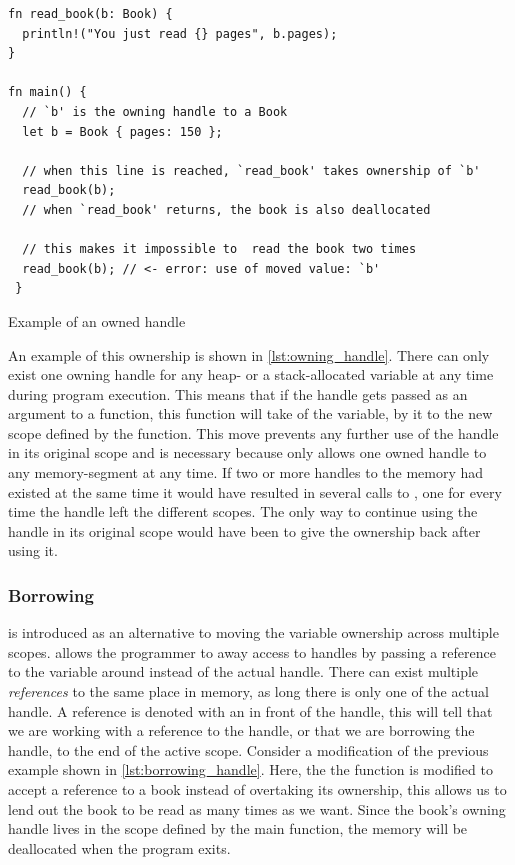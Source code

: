 \begin{listing}[tb]
\begin{verbatim}
fn read_book(b: Book) {
  println!("You just read {} pages", b.pages);
}

fn main() {
  // `b' is the owning handle to a Book
  let b = Book { pages: 150 };

  // when this line is reached, `read_book' takes ownership of `b'
  read_book(b);
  // when `read_book' returns, the book is also deallocated

  // this makes it impossible to  read the book two times
  read_book(b); // <- error: use of moved value: `b'
 }
\end{verbatim}
\caption{Example of an owned handle}
\label{lst:owning_handle}
\end{listing}

An example of this ownership is shown in \autoref{lst:owning_handle}.
There can only exist one owning handle for any heap- or a stack-allocated variable at any time during program execution.
This means that if the handle gets passed as an argument to a function, this function will take  of the variable, by  it to the new scope defined by the function.
This move prevents any further use of the handle in its original scope and is necessary because \rust only allows one owned handle to any memory-segment at any time.
If two or more handles to the memory had existed at the same time it would have resulted in several calls to , one for every time the handle left the different scopes.
The only way to continue using the handle in its original scope would have been to give the ownership back after using it.

\subsubsection{Borrowing}
\label{ssec:borrowing}

 is introduced as an alternative to moving the variable ownership across multiple scopes.
\rust allows the programmer to  away access to handles by passing a reference to the variable around instead of the actual handle.
There can exist multiple \emph{references} to the same place in memory, as long there is only one  of the actual handle.
A reference is denoted with an \code{\&} in front of the handle, this will tell \rust that we are working with a reference to the handle, or that we are borrowing the handle, to the end of the active scope.
Consider a modification of the previous example shown in \autoref{lst:borrowing_handle}.
Here, the the  function is modified to accept a reference to a book instead of overtaking its ownership, this allows us to lend out the book to be read as many times as we want.
Since the book's owning handle lives in the scope defined by the main function, the memory will be deallocated when the program exits.

